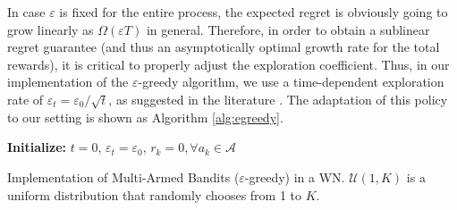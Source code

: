 \documentclass[10pt,journal,compsoc]{IEEEtran}
\begin{document}
	In case $\varepsilon$ is fixed for the entire process, the expected regret is obviously going to grow linearly as $\Omega\left(\varepsilon T\right)$ in general. Therefore, in order to obtain a sublinear regret guarantee (and thus an asymptotically optimal growth rate for the total rewards), it is critical to properly adjust the exploration coefficient. Thus, in our implementation of the $\varepsilon$-greedy algorithm, we use a time-dependent exploration rate of $\varepsilon_t = \varepsilon_0 / \sqrt{t}$, as suggested in the literature \cite{auer2002finite}. The adaptation of this policy to our setting is shown as Algorithm \ref{alg:egreedy}.

	\begin{algorithm}[H]	
		\SetAlgoLined
		\textbf{Initialize:} $t=0$, $\varepsilon_t = \varepsilon_0$, $r_{k} = 0, \forall a_k \in \mathcal{A}$\\
		\caption{Implementation of Multi-Armed Bandits ($\varepsilon$-greedy) in a WN. $\mathcal{U}(1, K)$ is a uniform distribution that randomly chooses from 1 to $K$.}
		\label{alg:egreedy}			
	\end{algorithm}
\end{document}
